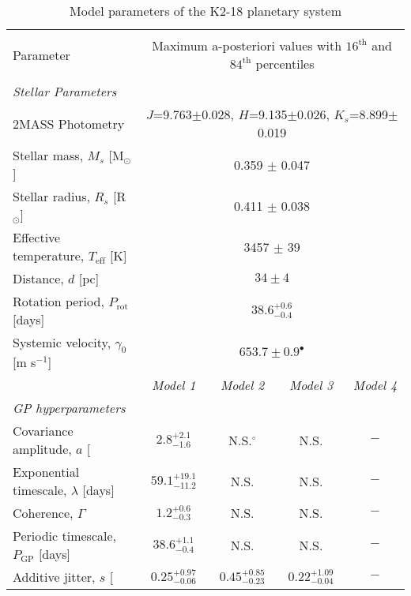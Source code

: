 \clearpage
\begin{landscape}
\begin{table*}
\footnotesize
\centering
\renewcommand{\arraystretch}{0.6}
\caption{Model parameters of the K2-18 planetary system}
\label{k218table:k2184}
\begin{tabular}{lcccc}
\hline \\ [-1ex]
Parameter & \multicolumn{4}{c}{Maximum a-posteriori values with $16^{\text{th}}$ and $84^{\text{th}}$ percentiles} \\
\hline \\ [-1ex]
\emph{Stellar Parameters} & & & & \\
2MASS Photometry & \multicolumn{4}{c}{$J$=9.763$\pm$0.028, $H$=9.135$\pm$0.026, $K_s$=8.899$\pm$0.019} \\
Stellar mass, $M_s$ [M$_{\odot}$]  &  \multicolumn{4}{c}{0.359 $\pm$ 0.047}   \\
Stellar radius, $R_s$ [R$_{\odot}$]   &  \multicolumn{4}{c}{0.411 $\pm$ 0.038}   \\
Effective temperature, $T_{\text{eff}}$ [K]  & \multicolumn{4}{c}{3457 $\pm$ 39} \\
Distance, $d$ [pc] & \multicolumn{4}{c}{$34 \pm 4$} \\
Rotation period, $P_{\text{rot}}$ [days] & \multicolumn{4}{c}{$38.6^{+0.6}_{-0.4}$} \\
Systemic velocity, $\gamma_0$ [m s$^{-1}$] & \multicolumn{4}{c}{$653.7 \pm 0.9^{\bullet}$} \medskip \\

& \emph{Model 1} & \emph{Model 2} & \emph{Model 3} & \emph{Model 4} \\
\emph{GP hyperparameters} & & & & \\
Covariance amplitude, $a$ [\mps{]} & $2.8^{+2.1}_{-1.6}$ & N.S.$^{\circ}$ & N.S. & $-$ \\
Exponential timescale, $\lambda$ [days] &  $59.1^{+19.1}_{-11.2}$ & N.S. & N.S. & $-$\\
Coherence, $\Gamma$ & $1.2^{+0.6}_{-0.3}$ & N.S. & N.S. & $-$ \\
Periodic timescale, $P_{\text{GP}}$ [days] & $38.6^{+1.1}_{-0.4}$ & N.S. & N.S. & $-$ \\
Additive jitter, $s$ [\mps{]} & $0.25^{+0.97}_{-0.06}$ & $0.45^{+0.85}_{-0.23}$ & $0.22^{+1.09}_{-0.04}$ & $-$ \medskip \\


\end{tabular}
\end{table*}
\end{landscape}
